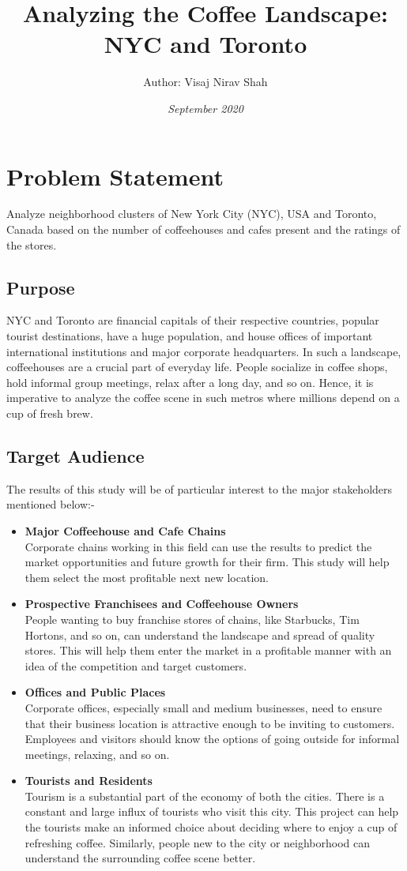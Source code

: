 \documentclass{article}
\title{\textbf{Analyzing the Coffee Landscape: \\NYC and Toronto}}
\author{Author: Visaj Nirav Shah}
\date{\emph{September 2020}}
\begin{document}
\maketitle

\section{Problem Statement}
{Analyze neighborhood clusters of New York City (NYC), USA and Toronto, Canada based on the number of coffeehouses and cafes present and the ratings of the stores.}
\subsection{Purpose}
{NYC and Toronto are financial capitals of their respective countries, popular tourist destinations, have a huge population, and house offices of important international institutions and major corporate headquarters. In such a landscape, coffeehouses are a crucial part of everyday life. People socialize in coffee shops, hold informal group meetings, relax after a long day, and so on. Hence, it is imperative to analyze the coffee scene in such metros where millions depend on a cup of fresh brew.}
\subsection{Target Audience}
{The results of this study will be of particular interest to the major stakeholders mentioned below:-}
\begin{itemize}
    \item \textbf{Major Coffeehouse and Cafe Chains}\\{Corporate chains working in this field can use the results to predict the market opportunities and future growth for their firm. This study will help them select the most profitable next new location.}
    \item \textbf{Prospective Franchisees and Coffeehouse Owners}\\{People wanting to buy franchise stores of chains, like Starbucks, Tim Hortons, and so on, can understand the landscape and spread of quality stores. This will help them enter the market in a profitable manner with an idea of the competition and target customers.}
    \pagebreak
    \item \textbf{Offices and Public Places}\\{Corporate offices, especially small and medium businesses, need to ensure that their business location is attractive enough to be inviting to customers. Employees and visitors should know the options of going outside for informal meetings, relaxing, and so on.}
    \item \textbf{Tourists and Residents}\\{Tourism is a substantial part of the economy of both the cities. There is a constant and large influx of tourists who visit this city. This project can help the tourists make an informed choice about deciding where to enjoy a cup of refreshing coffee. Similarly, people new to the city or neighborhood can understand the surrounding coffee scene better.}
\end{itemize}
\end{document}

